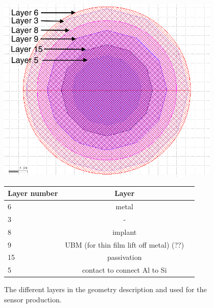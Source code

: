 \begin{figure}[htbp]
  \centering
  \begin{minipage}[t]{.4\textwidth}
    \centering
    \vspace{0pt}
    \includegraphics[width=0.95\textwidth]{figures/ActiveEdge/pixelLayout_withLayers.png}
    \caption{The different layers in the geometry description and used
      for the sensor production.}
    \label{fig:PixelLayout}
  \end{minipage}
  \hfill
  \begin{minipage}[t]{.56\textwidth}
    \centering
    \vspace{0pt}
    \label{tab:PixelStackDimensions}
    \begin{tabular}{l c c}
      \toprule
      Layer number & Layer \\
      \midrule
      6 & metal\\
      3 & - \\
      8 & implant \\
      9 & UBM (for thin film lift off metal) (??) \\
      15 & passivation \\
      5 & contact to connect Al to Si \\
      \bottomrule
    \end{tabular}
  \end{minipage}
\end{figure}

